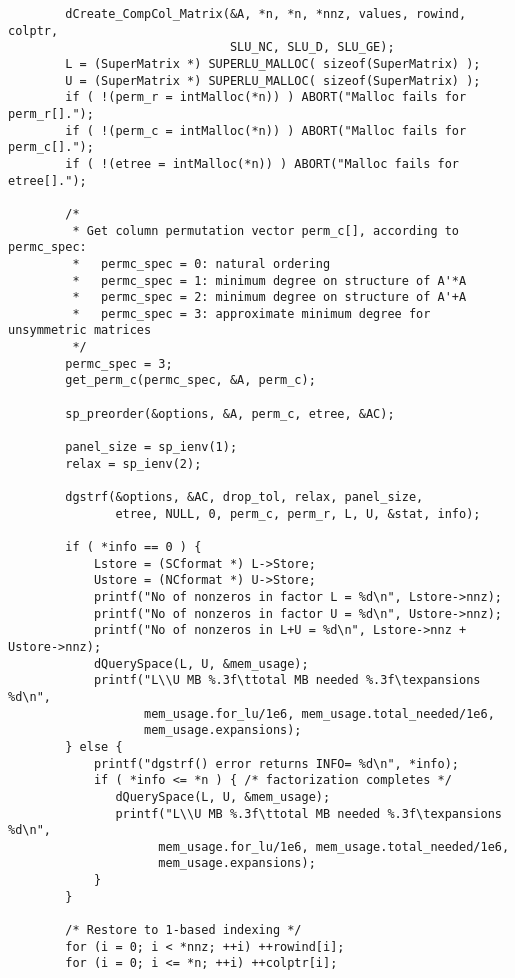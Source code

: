 \begin{verbatim}
        dCreate_CompCol_Matrix(&A, *n, *n, *nnz, values, rowind, colptr,
                               SLU_NC, SLU_D, SLU_GE);
        L = (SuperMatrix *) SUPERLU_MALLOC( sizeof(SuperMatrix) );
        U = (SuperMatrix *) SUPERLU_MALLOC( sizeof(SuperMatrix) );
        if ( !(perm_r = intMalloc(*n)) ) ABORT("Malloc fails for perm_r[].");
        if ( !(perm_c = intMalloc(*n)) ) ABORT("Malloc fails for perm_c[].");
        if ( !(etree = intMalloc(*n)) ) ABORT("Malloc fails for etree[].");

        /*
         * Get column permutation vector perm_c[], according to permc_spec:
         *   permc_spec = 0: natural ordering 
         *   permc_spec = 1: minimum degree on structure of A'*A
         *   permc_spec = 2: minimum degree on structure of A'+A
         *   permc_spec = 3: approximate minimum degree for unsymmetric matrices
         */    	
        permc_spec = 3;
        get_perm_c(permc_spec, &A, perm_c);
	
        sp_preorder(&options, &A, perm_c, etree, &AC);

        panel_size = sp_ienv(1);
        relax = sp_ienv(2);

        dgstrf(&options, &AC, drop_tol, relax, panel_size, 
               etree, NULL, 0, perm_c, perm_r, L, U, &stat, info);

        if ( *info == 0 ) {
            Lstore = (SCformat *) L->Store;
            Ustore = (NCformat *) U->Store;
            printf("No of nonzeros in factor L = %d\n", Lstore->nnz);
            printf("No of nonzeros in factor U = %d\n", Ustore->nnz);
            printf("No of nonzeros in L+U = %d\n", Lstore->nnz + Ustore->nnz);
            dQuerySpace(L, U, &mem_usage);
            printf("L\\U MB %.3f\ttotal MB needed %.3f\texpansions %d\n",
                   mem_usage.for_lu/1e6, mem_usage.total_needed/1e6,
                   mem_usage.expansions);
        } else {
            printf("dgstrf() error returns INFO= %d\n", *info);
            if ( *info <= *n ) { /* factorization completes */
               dQuerySpace(L, U, &mem_usage);
               printf("L\\U MB %.3f\ttotal MB needed %.3f\texpansions %d\n",
                     mem_usage.for_lu/1e6, mem_usage.total_needed/1e6,
                     mem_usage.expansions);
            }
        }
	
        /* Restore to 1-based indexing */
        for (i = 0; i < *nnz; ++i) ++rowind[i];
        for (i = 0; i <= *n; ++i) ++colptr[i];


\end{verbatim}
